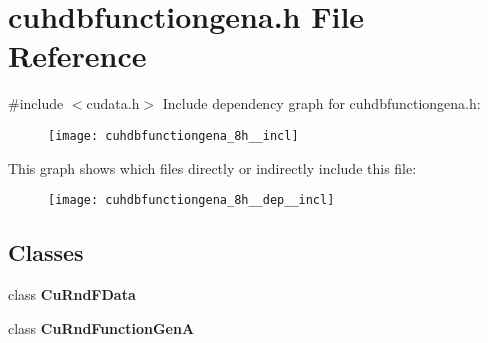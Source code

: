 \section{cuhdbfunctiongena.\+h File Reference}
\label{cuhdbfunctiongena_8h}
{\ttfamily \#include $<$cudata.\+h$>$}\newline
Include dependency graph for cuhdbfunctiongena.\+h\+:
\nopagebreak
\begin{figure}[H]
\begin{center}
\leavevmode
\texttt{[image: cuhdbfunctiongena\_8h\_\_incl]}
\end{center}
\end{figure}
This graph shows which files directly or indirectly include this file\+:
\nopagebreak
\begin{figure}[H]
\begin{center}
\leavevmode
\texttt{[image: cuhdbfunctiongena\_8h\_\_dep\_\_incl]}
\end{center}
\end{figure}
\subsection*{Classes}
\begin{DoxyCompactItemize}
\item 
class \textbf{ Cu\+Rnd\+F\+Data}
\item 
class \textbf{ Cu\+Rnd\+Function\+GenA}
\end{DoxyCompactItemize}
